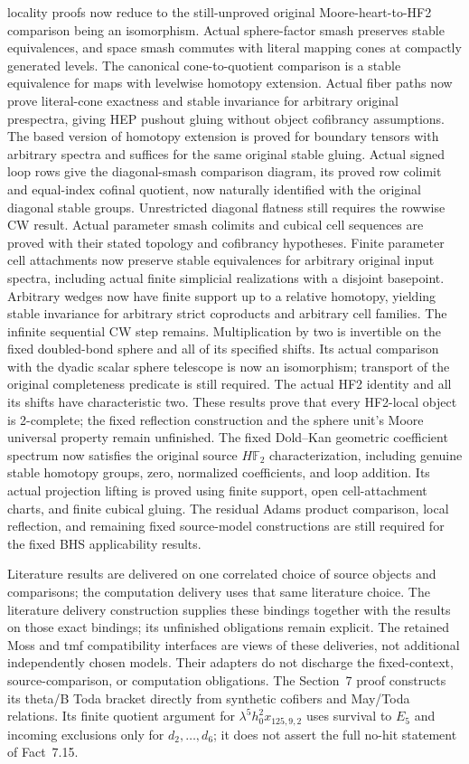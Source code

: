 locality proofs now reduce to the still-unproved original Moore-heart-to-HF2
comparison being an isomorphism. Actual sphere-factor
smash preserves stable equivalences, and space smash commutes with literal
mapping cones at compactly generated levels. The canonical cone-to-quotient
comparison is a stable equivalence for maps with levelwise homotopy extension.
Actual fiber paths now prove literal-cone exactness and stable invariance for
arbitrary original prespectra, giving HEP pushout gluing without object
cofibrancy assumptions. The based version of homotopy extension is proved
for boundary tensors with arbitrary spectra and suffices for the same
original stable gluing. Actual signed loop rows give the diagonal-smash
comparison diagram, its proved row colimit and equal-index cofinal quotient,
now naturally identified with the original diagonal stable groups.
Unrestricted diagonal flatness still requires the rowwise CW result.
Actual parameter smash colimits and cubical cell
sequences are proved with their stated topology and cofibrancy hypotheses.
Finite parameter cell attachments now preserve stable equivalences for
arbitrary original input spectra, including actual finite simplicial realizations
with a disjoint basepoint. Arbitrary wedges now have finite support up to a
relative homotopy, yielding stable invariance for arbitrary strict coproducts
and arbitrary cell families. The infinite sequential CW step remains. Multiplication by two is invertible
on the fixed doubled-bond sphere and all of its specified shifts. Its actual
comparison with the dyadic scalar sphere telescope is now an isomorphism;
transport of the original completeness predicate is still required. The actual
HF2 identity and all its shifts have characteristic two. These results prove
that every HF2-local object is 2-complete; the fixed reflection construction
and the sphere unit's Moore universal property remain unfinished.
The fixed Dold--Kan geometric coefficient spectrum now satisfies
the original source $H\mathbb F_2$ characterization, including genuine stable
homotopy groups, zero, normalized coefficients, and loop addition. Its actual
projection lifting is proved using finite support, open cell-attachment charts,
and finite cubical gluing. The residual Adams product comparison, local
reflection, and remaining fixed source-model constructions are still required
for the fixed BHS applicability results.

Literature results are delivered on one correlated choice of source objects
and comparisons; the computation delivery uses that same literature choice.
The literature delivery construction supplies these bindings together with
the results on those exact bindings; its unfinished obligations remain explicit.
The retained Moss and tmf compatibility interfaces are views of these
deliveries, not additional independently chosen models. Their adapters do
not discharge the fixed-context, source-comparison, or computation obligations.
The Section~7 proof constructs its theta/B Toda bracket directly from
synthetic cofibers and May/Toda relations. Its finite quotient argument for
$\lambda^5h_0^2x_{125,9,2}$ uses survival to $E_5$ and incoming exclusions
only for $d_2,\ldots,d_6$; it does not assert the full no-hit statement of
Fact~7.15.

